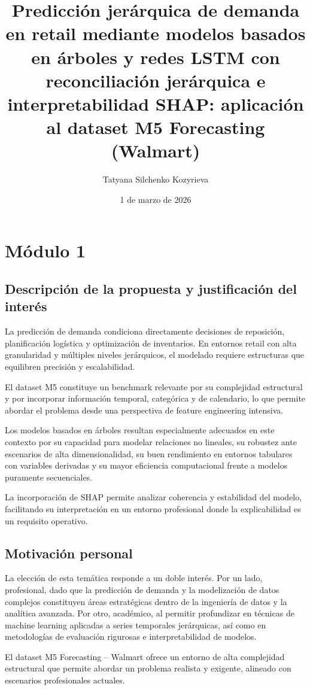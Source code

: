 \documentclass[IB,BIB]{TFUOC}%
\title{Predicción jerárquica de demanda en retail mediante modelos basados en árboles y redes LSTM con reconciliación jerárquica e interpretabilidad SHAP: aplicación al dataset M5 Forecasting (Walmart)}
\author{Tatyana Silchenko Kozyrieva}
\date{1 de marzo de 2026}
\begin{document}
\estructura

\tableofcontents


\chapter{Módulo 1}

\section{Descripción de la propuesta y justificación del interés}

La predicción de demanda condiciona directamente decisiones de
reposición, planificación logística y optimización de inventarios. En
entornos retail con alta granularidad y múltiples niveles jerárquicos,
el modelado requiere estructuras que equilibren precisión y
escalabilidad.

El dataset M5 constituye un benchmark relevante por su complejidad
estructural y por incorporar información temporal, categórica y de
calendario, lo que permite abordar el problema desde una perspectiva de
feature engineering intensiva.

Los modelos basados en árboles resultan especialmente adecuados en este
contexto por su capacidad para modelar relaciones no lineales, su
robustez ante escenarios de alta dimensionalidad, su buen rendimiento en
entornos tabulares con variables derivadas y su mayor eficiencia
computacional frente a modelos puramente secuenciales.

La incorporación de SHAP permite analizar coherencia y estabilidad del
modelo, facilitando su interpretación en un entorno profesional donde la
explicabilidad es un requisito operativo.

\section{Motivación personal}

La elección de esta temática responde a un doble interés. Por un lado,
profesional, dado que la predicción de demanda y la modelización de
datos complejos constituyen áreas estratégicas dentro de la ingeniería
de datos y la analítica avanzada. Por otro, académico, al permitir
profundizar en técnicas de machine learning aplicadas a series
temporales jerárquicas, así como en metodologías de evaluación rigurosas
e interpretabilidad de modelos.

El dataset M5 Forecasting -- Walmart ofrece un entorno de alta
complejidad estructural que permite abordar un problema realista y
exigente, alineado con escenarios profesionales actuales.
\end{document}
